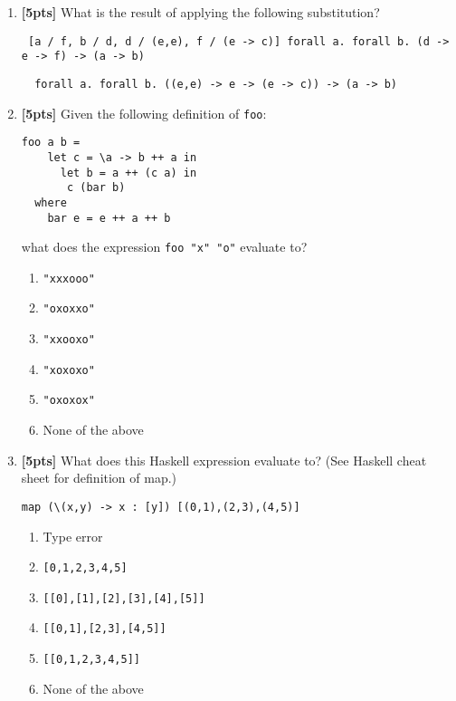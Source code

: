 \documentclass[paper=letter, fontsize=13pt]{article} %
\numberwithin{equation}{section} %
\newif\ifshowanswers\showanswerstrue
\begin{document}
\begin{enumerate}
\item \textbf{[5pts]} What is the result of applying the following substitution? 
\begin{verbatim}
 [a / f, b / d, d / (e,e), f / (e -> c)] forall a. forall b. (d -> e -> f) -> (a -> b)
\end{verbatim}
  \ifshowanswers
  \begin{verbatim}
  forall a. forall b. ((e,e) -> e -> (e -> c)) -> (a -> b)
 \end{verbatim}
\else
  \bigskip
  \bigskip
  \bigskip
  \bigskip
  \bigskip
  \bigskip
  \bigskip
  \bigskip
  \bigskip
  \bigskip
  \bigskip
  \fi
  

\newpage
{}
\bigskip
\bigskip
\bigskip

\item \textbf{[5pts]} Given the following definition of \texttt{foo}:
\begin{lstlisting}
foo a b = 
    let c = \a -> b ++ a in
      let b = a ++ (c a) in
       c (bar b)
  where 
    bar e = e ++ a ++ b
\end{lstlisting}
  what does the expression \texttt{foo "x" "o"} evaluate to?
\begin{enumerate}
\item \texttt{"xxxooo"}
\item \texttt{"oxoxxo"}
\item \texttt{"xxooxo"}
\item \texttt{"xoxoxo"}
\item \texttt{"oxoxox"}
\item None of the above
\end{enumerate}

\item \textbf{[5pts]}  What does this Haskell expression evaluate to?
  (See Haskell cheat sheet for definition of map.)
\begin{lstlisting}
map (\(x,y) -> x : [y]) [(0,1),(2,3),(4,5)]
\end{lstlisting}
  \begin{enumerate}
    \item Type error
    \item \verb|[0,1,2,3,4,5]|
    \item \verb|[[0],[1],[2],[3],[4],[5]]|
    \item \verb|[[0,1],[2,3],[4,5]]|
    \item \verb|[[0,1,2,3,4,5]]|
    \item None of the above
  \end{enumerate}


\end{enumerate}
\end{document}
